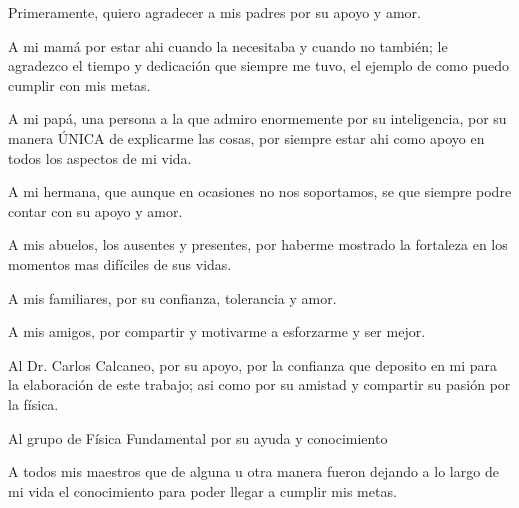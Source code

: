 Primeramente, quiero agradecer a mis padres por su apoyo y amor. 

A mi mamá por estar ahi cuando la necesitaba y cuando no también; le agradezco el tiempo y dedicación que siempre me tuvo, el ejemplo de como puedo cumplir con mis metas.

A mi papá, una persona a la que admiro enormemente por su inteligencia, por su manera ÚNICA de explicarme las cosas, por siempre estar ahi como apoyo en todos los aspectos de mi vida.

A mi hermana, que aunque en ocasiones no nos soportamos, se que siempre podre contar con su apoyo y amor.

A mis abuelos, los ausentes y presentes, por haberme mostrado la fortaleza en los momentos mas difíciles de sus vidas.

A mis familiares, por su confianza, tolerancia y amor.

A mis amigos, por compartir y motivarme a esforzarme y ser mejor.

Al Dr. Carlos Calcaneo, por su apoyo, por la confianza que deposito en mi para la elaboración de este trabajo; asi como por su amistad y compartir su pasión por la física.

Al grupo de Física Fundamental por su ayuda y conocimiento

A todos mis maestros que de alguna u otra manera fueron dejando a lo largo de mi vida el conocimiento para poder llegar a cumplir mis metas.
